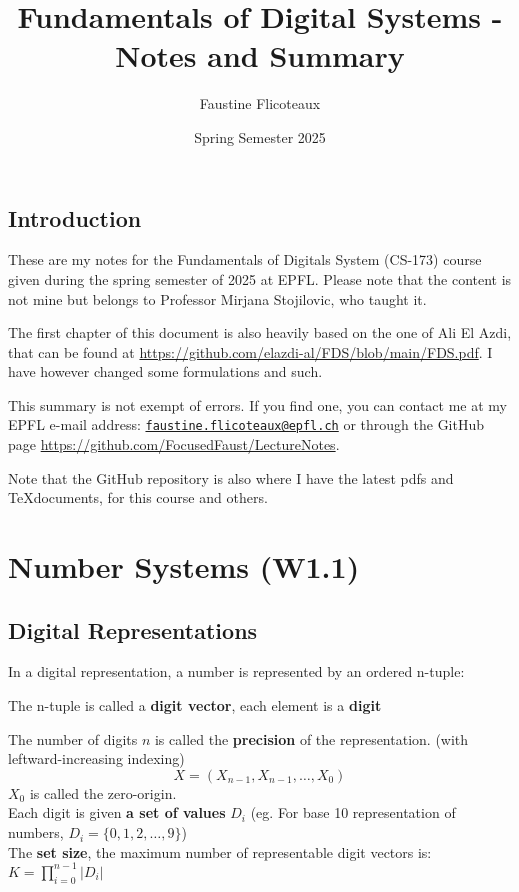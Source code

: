 \documentclass[10pt,a4paper]{book}
\title{Fundamentals of Digital Systems - Notes and Summary}
\author{Faustine Flicoteaux}
\date{Spring Semester 2025}
\begin{document}
\maketitle
\tableofcontents
\newpage

\section*{Introduction}
These are my notes for the Fundamentals of Digitals System (CS-173) course given during the spring semester of 2025 at EPFL. Please note that the content is not mine but belongs to Professor Mirjana Stojilovic, who taught it.\par 
The first chapter of this document is also heavily based on the one of Ali El Azdi, that can be found at \url{https://github.com/elazdi-al/FDS/blob/main/FDS.pdf}. I have however changed some formulations and such.\par
This summary is not exempt of errors. If you find one, you can contact me at my EPFL e-mail address: \texttt{\href{mailto:faustine.flicoteaux@epfl.ch}{faustine.flicoteaux@epfl.ch}} or through the GitHub page \url{https://github.com/FocusedFaust/LectureNotes}.\par 
Note that the GitHub repository is also where I have the latest pdfs and \TeX documents, for this course and others.

\chapter{Number Systems (W1.1)}

\section{Digital Representations}
In a digital representation, a number is represented by an ordered n-tuple:\par 
The n-tuple is called a \textbf{digit vector}, each element is a \textbf{digit}\par
The number of digits $n$ is called the \textbf{precision} of the representation. (with leftward-increasing indexing)
\[ X  = (X _{n-1}, X _{n-1}, \ldots, X _{0}) \]
$X _{0}$ is called the zero-origin.\\
Each digit is given \textbf{a set of values} $D_{i}$ (eg. For base 10 representation of numbers, $D_i = \{0,1,2, \dots, 9\}$)\\
The \textbf{set size}, the maximum number of representable digit vectors is: $K = \prod_{i=0}^{n-1} |D_{i}|$
\end{document}
